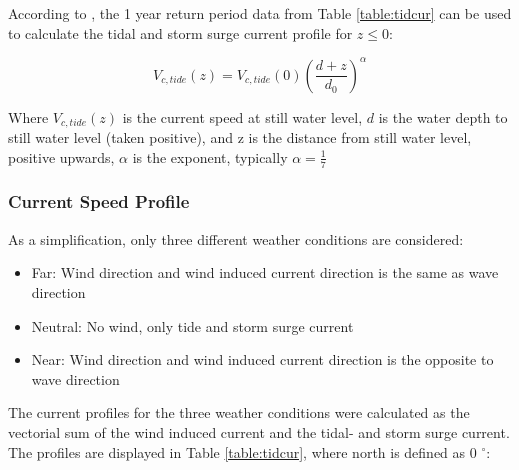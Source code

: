 \noindent According to \cite{dnvenviroment}, the 1 year return period data from Table \ref{table:tidcur} can be used to calculate the tidal and storm surge current profile for $z \leq 0$:

 \begin{equation}
      V_{c,tide}(z)= V_{c,tide}(0) \left( \frac{d+z}{d_0}\right)^{\alpha}
  \end{equation}
  
  \noindent Where $ V_{c,tide}(z)$ is the current speed at still water level, $d$ is the water depth to still water level (taken positive), and z is the distance from still water level, positive upwards, $\alpha$ is the exponent, typically $\alpha = \frac{1}{7}$

   \subsubsection{Current Speed Profile}
  As a simplification, only three different weather conditions are considered: 
  \begin{itemize}
      \item Far: Wind direction and wind induced current direction is the same as wave direction
     \item Neutral: No wind, only tide and storm surge current
     \item Near:  Wind direction and wind induced current direction is the opposite to wave direction
  \end{itemize}
 The current profiles for the three weather conditions were calculated as the vectorial sum of the wind induced current and the tidal- and storm surge current. The profiles are displayed in Table \ref{table:tidcur}, where north is defined as 0 $^{\circ}$:  
